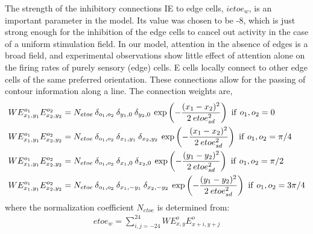The strength of the inhibitory connections IE to edge cells,
$ietoe_w$, is an important parameter in the model. Its value was
chosen to be -8, which is just strong enough for the inhibition of the
edge cells to cancel out activity in the case of a uniform stimulation
field. In our model, attention in the absence of edges is a broad
field, and experimental observations show little effect of attention
alone on the firing rates of purely sensory (edge) cells.
%
%
E cells locally connect to other edge cells of the same preferred
orientation. These connections allow for the passing of contour
information along a line. The connection weights are,
\begin{align}
	WE^{o_1}_{x_1,y_1}E^{o_2}_{x_2,y_2}&=N_{etoe}\: \delta_{o_1,o_2}\: \delta_{y_1,0}\: \delta_{y_2,0}\:
	\exp\left(-\frac{(x_1-x_2)^2}{2\: etoe_{sd} ^2}\right)\ {\rm
          if}\ o_1,o_2 = 0 \nonumber\\
	WE^{o_1}_{x_1,y_1}E^{o_2}_{x_2,y_2}&=N_{etoe}\: \delta_{o_1,o_2}\: \delta_{x_1,y_1}\: \delta_{x_2,y_2}\: 
	\exp\left(-\frac{(x_1-x_2)^2}{2\: etoe_{sd} ^2}\right)\  {\rm
          if}\ o_1,o_2 = \pi/4 \nonumber\\
	WE^{o_1}_{x_1,y_1}E^{o_2}_{x_2,y_2}&=N_{etoe}\: \delta_{o_1,o_2}\: \delta_{x_1,0}\: \delta_{x_2,0}\:
	\exp\left(-\frac{(y_1-y_2)^2}{2\: etoe_{sd} ^2}\right)\  {\rm
          if}\ o_1,o_2 = \pi/2 \nonumber\\
	WE^{o_1}_{x_1,y_1}E^{o_2}_{x_2,y_2}&=N_{etoe}\: \delta_{o_1,o_2}\: \delta_{x_1,-y_1}\: \delta_{x_2,-y_2}\: 
	\exp\left(-\frac{(y_1-y_2)^2}{2\: etoe_{sd} ^2}\right)\  {\rm
          if}\ o_1,o_2 = 3\pi/4 \nonumber\\
\end{align}
where the normalization coefficient $N_{etoe}$ is determined from:
\begin{align}
	etoe_w = \sum^{24}_{i,j=-24} WE^{o}_{x,y}E^{o}_{x+i,y+j}
\end{align}

